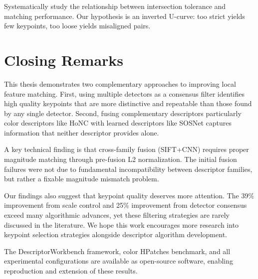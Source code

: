 Systematically study the relationship between intersection tolerance and matching performance. Our hypothesis is an inverted U-curve: too strict yields few keypoints, too loose yields misaligned pairs.

\section{Closing Remarks}

This thesis demonstrates two complementary approaches to improving local feature matching. First, using multiple detectors as a consensus filter identifies high quality keypoints that are more distinctive and repeatable than those found by any single detector. Second, fusing complementary descriptors particularly color descriptors like HoNC with learned descriptors like SOSNet captures information that neither descriptor provides alone.

A key technical finding is that cross-family fusion (SIFT+CNN) requires proper magnitude matching through pre-fusion L2 normalization. The initial fusion failures were not due to fundamental incompatibility between descriptor families, but rather a fixable magnitude mismatch problem.

Our findings also suggest that keypoint quality deserves more attention. The 39\% improvement from scale control and 25\% improvement from detector consensus exceed many algorithmic advances, yet these filtering strategies are rarely discussed in the literature. We hope this work encourages more research into keypoint selection strategies alongside descriptor algorithm development.

The DescriptorWorkbench framework, color HPatches benchmark, and all experimental configurations are available as open-source software, enabling reproduction and extension of these results.
